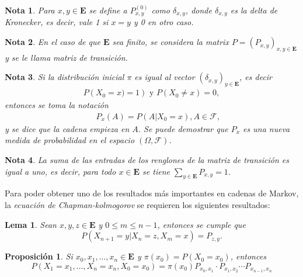 \documentclass{article}
\newtheorem{Note}{Nota}
\newtheorem{Prop}{Proposición}
\newtheorem{Lema}{Lema}
\newcommand{\Eb}{\mathbf{E}}
\begin{document}
\begin{Note}
Para $x,y\in\mathbf{E}$ se define a $P^{(0)}_{x,y}$ como $\delta_{x,y}$, donde $\delta_{x,y}$ es la delta de Kronecker, es decir, vale 1 si $x=y$ y 0 en otro caso.
\end{Note}


\begin{Note}
En el caso de que $\mathbf{E}$ sea finito, se considera la matrix $P=\left(P_{x,y}\right)_{x,y\in \mathbf{E}}$ y se le llama \textit{matriz de transición}.
\end{Note}


\begin{Note}
Si la distribución inicial $\pi$ es igual al vector $\left(\delta_{x,y}\right)_{y\in\mathbf{E}}$, es decir
\begin{eqnarray*}
P\left(X_{0}=x)=1\right)\textrm{ y }P\left(X_{0}\neq x\right)=0,
\end{eqnarray*}
entonces se toma la notación 
\begin{eqnarray}
&&P_{x}\left(A\right)=P\left(A|X_{0}=x\right),A\in\mathcal{F},
\end{eqnarray}
y se dice que la cadena empieza en $A$. Se puede demostrar que $P_{x}$ es una nueva medida de probabilidad en el espacio $\left(\Omega,\mathcal{F}\right)$.
\end{Note}


\begin{Note}
La suma de las entradas de los renglones de la matriz de transición es igual a uno, es decir, para todo $x\in \mathbf{E}$ se tiene $\sum_{y\in\mathbf{E}}P_{x,y}=1$.
\end{Note}

Para poder obtener uno de los resultados más importantes en cadenas de Markov, la \textit{ecuación de Chapman-kolmogorov} se requieren los siguientes resultados:

\begin{Lema}
Sean $x,y,z\in\Eb$ y $0\leq m\leq n-1$, entonces se cumple que
\begin{equation}
P\left(X_{n+1}=y|X_{n}=z,X_{m}=x\right)=P_{z,y}.
\end{equation}
\end{Lema}


\begin{Prop}
Si $x_{0},x_{1},\ldots,x_{n}\in \Eb$ y $\pi\left(x_{0}\right)=P\left(X_{0}=x_{0}\right)$, entonces
\begin{equation}
P\left(X_{1}=x_{1},\ldots,X_{n}=x_{n},X_{0}=x_{0}\right)=\pi\left(x_{0}\right)P_{x_{0},x_{1}}\cdot P_{x_{1},x_{2}}\cdots P_{x_{n-1},x_{n}}
\end{equation}
\end{Prop}
\end{document}
